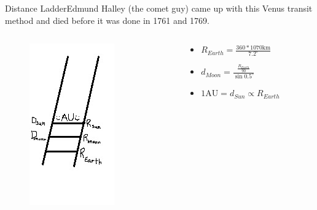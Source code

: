 \documentclass[12pt]{beamer}
\begin{document}
        \begin{frame}{Distance Ladder}{Edmund Halley (the comet guy) came up with this Venus transit method and died before it was done in 1761 and 1769.}
            \begin{columns}
                \begin{column}{0.5\linewidth}
                    \begin{figure}
                        \includegraphics{distanceladder2.jpg}
                    \end{figure}
                \end{column}
                \begin{column}{0.5\linewidth}
                    \begin{itemize}
                        \item $R_{Earth}=\frac{360*1070\mathrm{km}}{7.2^\circ}$
                        \item $d_{Moon}=\frac{\frac{R_{Earth}}{90}}{\sin{0.5^\circ}}$
                        \item $\mathrm{1AU}=d_{Sun}\propto{R_{Earth}}$
                    \end{itemize}
                \end{column}
            \end{columns}
        \end{frame}
\end{document}
